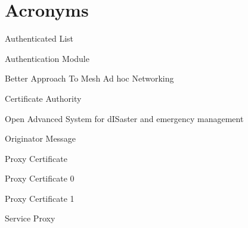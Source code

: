 \chapter*{Acronyms}

\begin{acronym}


 {Authenticated List}

 {Authentication Module}

 {Better Approach To Mesh Ad hoc Networking}

 {Certificate Authority}










 {Open Advanced System for dISaster and emergency management}

 {Originator Message}



 {Proxy Certificate}

 {Proxy Certificate 0}

 {Proxy Certificate 1}





 {Service Proxy}


%

\end{acronym}
